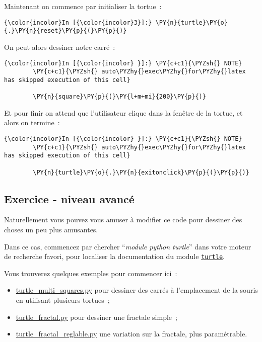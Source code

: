     Maintenant on commence par initialiser la tortue~:

    \begin{Verbatim}[commandchars=\\\{\}]
{\color{incolor}In [{\color{incolor}3}]:} \PY{n}{turtle}\PY{o}{.}\PY{n}{reset}\PY{p}{(}\PY{p}{)}
\end{Verbatim}


    On peut alors dessiner notre carré~:

    \begin{Verbatim}[commandchars=\\\{\}]
{\color{incolor}In [{\color{incolor} }]:} \PY{c+c1}{\PYZsh{} NOTE}
        \PY{c+c1}{\PYZsh{} auto\PYZhy{}exec\PYZhy{}for\PYZhy{}latex has skipped execution of this cell}
        
        \PY{n}{square}\PY{p}{(}\PY{l+m+mi}{200}\PY{p}{)}
\end{Verbatim}


    Et pour finir on attend que l'utilisateur clique dans la fenêtre de la
tortue, et alors on termine~:

    \begin{Verbatim}[commandchars=\\\{\}]
{\color{incolor}In [{\color{incolor} }]:} \PY{c+c1}{\PYZsh{} NOTE}
        \PY{c+c1}{\PYZsh{} auto\PYZhy{}exec\PYZhy{}for\PYZhy{}latex has skipped execution of this cell}
        
        \PY{n}{turtle}\PY{o}{.}\PY{n}{exitonclick}\PY{p}{(}\PY{p}{)}
\end{Verbatim}


    \hypertarget{exercice---niveau-avancuxe9}{%
\subsection{Exercice - niveau
avancé}\label{exercice---niveau-avancuxe9}}

    Naturellement vous pouvez vous amuser à modifier ce code pour dessiner
des choses un peu plus amusantes.

Dans ce cas, commencez par chercher ``\emph{module python turtle}'' dans
votre moteur de recherche favori, pour localiser la documentation du
module
\href{https://docs.python.org/3/library/turtle.html}{\texttt{turtle}}.

Vous trouverez quelques exemples pour commencer ici~:

\begin{itemize}
\tightlist
\item
  \href{media/turtle_multi_squares.py}{turtle\_multi\_squares.py} pour
  dessiner des carrés à l'emplacement de la souris en utilisant
  plusieurs tortues~;
\item
  \href{media/turtle_fractal.py}{turtle\_fractal.py} pour dessiner une
  fractale simple~;
\item
  \href{media/turtle_fractal_reglable.py}{turtle\_fractal\_reglable.py}
  une variation sur la fractale, plus paramétrable.
\end{itemize}


    
    
    
